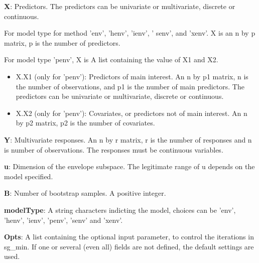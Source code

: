 \documentclass[a4paper,11pt,openany]{memoir}
\begin{document}
\begin{par}
\textbf{X}: Predictors.   The predictors can be univariate or multivariate, discrete or continuous.
\end{par} \vspace{1em}
\begin{par}
For model type for method 'env', 'henv', 'ienv', ' senv', and 'xenv'. X is an n by p matrix, p is the number of predictors.
\end{par} \vspace{1em}
\begin{par}
For model type 'penv', X is  A list containing the value of X1 and X2.
\end{par} \vspace{1em}
\begin{itemize}
\setlength{\itemsep}{-1ex}
   \item X.X1 (only for 'penv'): Predictors of main interest. An n by p1 matrix, n is the number of observations, and p1 is the number of main predictors. The predictors can be univariate or multivariate, discrete or continuous.
   \item X.X2 (only for 'penv'): Covariates, or predictors not of main interest.  An n by p2 matrix, p2 is the number of covariates.
\end{itemize}
\begin{par}
\textbf{Y}: Multivariate responses. An n by r matrix, r is the number of responses and n is number of observations. The responses must be continuous variables.
\end{par} \vspace{1em}
\begin{par}
\textbf{u}: Dimension of the envelope subspace. The legitimate range of u depends on the model specified.
\end{par} \vspace{1em}
\begin{par}
\textbf{B}: Number of bootstrap samples.  A positive integer.
\end{par} \vspace{1em}
\begin{par}
\textbf{modelType}: A string characters indicting the model, choices can be 'env', 'henv', 'ienv', 'penv', 'senv' and 'xenv'.
\end{par} \vspace{1em}
\begin{par}
\textbf{Opts}: A list containing the optional input parameter, to control the iterations in sg\_min. If one or several (even all) fields are not defined, the default settings are used.
\end{par} \vspace{1em}
\end{document}
